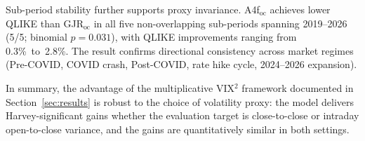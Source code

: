 Sub-period stability further supports proxy invariance. A4f$_\mathrm{oc}$ achieves
lower QLIKE than GJR$_\mathrm{oc}$ in all five non-overlapping sub-periods spanning
2019--2026 (5/5; binomial $p = 0.031$), with QLIKE improvements ranging from
0.3\%~to~2.8\%. The result confirms directional consistency across market regimes
(Pre-COVID, COVID crash, Post-COVID, rate hike cycle, 2024--2026 expansion).

In summary, the advantage of the multiplicative VIX$^2$ framework documented in
Section~\ref{sec:results} is robust to the choice of volatility proxy:
the model delivers Harvey-significant gains whether the evaluation target is
close-to-close or intraday open-to-close variance, and the gains are quantitatively
similar in both settings.


%
